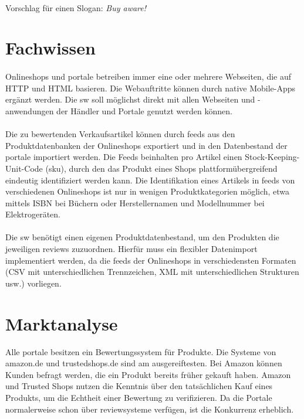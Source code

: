 \documentclass{article}
\begin{document}
\paragraph{}
Vorschlag für einen Slogan: \textit{Buy aware!}

\section{Fachwissen}
\paragraph{}
Onlineshops und \gls{portal}e betreiben immer eine oder mehrere Webseiten, die auf HTTP und HTML basieren. Die Webauftritte können durch native Mobile-Apps ergänzt werden. Die \gls{sw} soll möglichst direkt mit allen Webseiten und -anwendungen der Händler und Portale genutzt werden können.

\paragraph{}
Die zu bewertenden Verkaufsartikel können durch \gls{feed}s aus den Produktdatenbanken der Onlineshops exportiert und in den Datenbestand der \gls{portal}e importiert werden. Die Feeds beinhalten pro Artikel einen Stock-Keeping-Unit-Code (\gls{sku}), durch den das Produkt eines Shops plattformübergreifend eindeutig identifiziert werden kann. Die Identifikation eines Artikels in \gls{feed}s von verschiedenen Onlineshops ist nur in wenigen Produktkategorien möglich, etwa mittels ISBN bei Büchern oder Herstellernamen und Modellnummer bei Elektrogeräten.

\paragraph{}
Die \gls{sw} benötigt einen eigenen Produktdatenbestand, um den Produkten die jeweiligen \gls{review}s zuzuordnen. Hierfür muss ein flexibler Datenimport implementiert werden, da die \gls{feed}s der Onlineshops in verschiedensten Formaten (CSV mit unterschiedlichen Trennzeichen, XML mit unterschiedlichen Strukturen usw.) vorliegen.

\section{Marktanalyse}
Alle \gls{portal}e besitzen ein Bewertungssystem für Produkte. Die Systeme von amazon.de und trustedshops.de sind am ausgereiftesten. Bei Amazon können Kunden befragt werden, die ein Produkt bereits früher gekauft haben. Amazon und Trusted Shops nutzen die Kenntnis über den tatsächlichen Kauf eines Produkts, um die Echtheit einer Bewertung zu verifizieren. Da die Portale normalerweise schon über \gls{review}systeme verfügen, ist die Konkurrenz erheblich.
\end{document}
